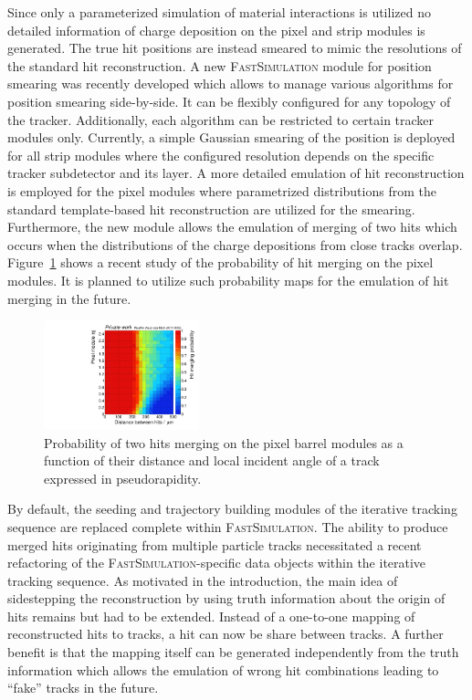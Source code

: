 \documentclass[a4paper]{jpconf}
\begin{document}
Since only a parameterized simulation of material interactions is utilized no detailed information of charge deposition on the pixel and strip modules is generated. The true hit positions are instead smeared to mimic the resolutions of the standard hit reconstruction. A new \textsc{FastSimulation} module for position smearing was recently developed which allows to manage various algorithms for position smearing side-by-side. It can be flexibly configured for any topology of the tracker. Additionally, each algorithm can be restricted to certain tracker modules only. Currently, a simple Gaussian smearing of the position is deployed for all strip modules where the configured resolution depends on the specific tracker subdetector and its layer. A more detailed emulation of hit reconstruction is employed for the pixel modules where parametrized distributions from the standard template-based hit reconstruction are utilized for the smearing. Furthermore, the new module allows the emulation of merging of two hits which occurs when the distributions of the charge depositions from close tracks overlap. Figure~\ref{fig:merge} shows a recent study of the probability of hit merging on the pixel modules. It is planned to utilize such probability maps for the emulation of hit merging in the future.

\begin{figure}[htbp]
\begin{center}
\includegraphics[width=0.4\textwidth]{figures/merge.pdf}
\caption{\label{fig:merge}Probability of two hits merging on the pixel barrel modules as a function of their distance and local incident angle of a track expressed in pseudorapidity.}
\end{center}
\end{figure}

By default, the seeding and trajectory building modules of the iterative tracking sequence are replaced complete within \textsc{FastSimulation}. The ability to produce merged hits originating from multiple particle tracks necessitated a recent refactoring of the \textsc{FastSimulation}-specific data objects within the iterative tracking sequence. As motivated in the introduction, the main idea of sidestepping the reconstruction by using truth information about the origin of hits remains but had to be extended. Instead of a one-to-one mapping of reconstructed hits to tracks, a hit can now be share between tracks. A further benefit is that the mapping itself can be generated independently from the truth information which allows the emulation of wrong hit combinations leading to ``fake'' tracks in the future.
\end{document}
